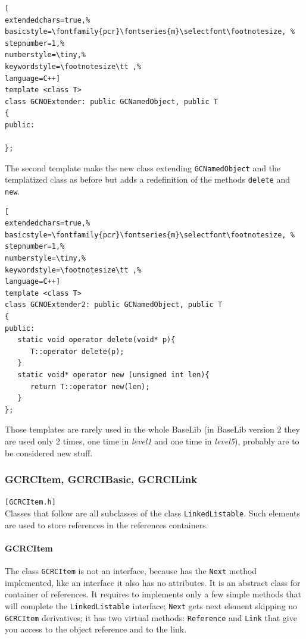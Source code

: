 \begin{lstlisting}[
extendedchars=true,%
basicstyle=\fontfamily{pcr}\fontseries{m}\selectfont\footnotesize, %
stepnumber=1,%
numberstyle=\tiny,%
keywordstyle=\footnotesize\tt ,%
language=C++]
template <class T>
class GCNOExtender: public GCNamedObject, public T
{
public:

};
\end{lstlisting}

The second template make the new class extending \texttt{GCNamedObject} and the templatized class as before but adds a redefinition of the methods \texttt{delete} and \texttt{new}.

\begin{lstlisting}[
extendedchars=true,%
basicstyle=\fontfamily{pcr}\fontseries{m}\selectfont\footnotesize, %
stepnumber=1,%
numberstyle=\tiny,%
keywordstyle=\footnotesize\tt ,%
language=C++]
template <class T>
class GCNOExtender2: public GCNamedObject, public T
{
public:
   static void operator delete(void* p){
      T::operator delete(p);
   }
   static void* operator new (unsigned int len){
      return T::operator new(len);
   }
};
\end{lstlisting}

Those templates are rarely used in the whole BaseLib (in BaseLib version 2 they are used only 2 times, one time in \textit{level1} and one time in \textit{level5}), probably are to be considered new stuff.



\subsubsection{GCRCItem, GCRCIBasic, GCRCILink}
\texttt{[GCRCItem.h]}\\
Classes that follow are all subclasses of the class \texttt{LinkedListable}. Such elements are used to store references in the references containers.

\paragraph{GCRCItem}
The class \texttt{GCRCItem} is not an interface, because has the \texttt{Next} method implemented, like an interface it also has no attributes. It is an abstract class for container of references. It requires to implements only a few simple methods that will complete the \texttt{LinkedListable} interface; \texttt{Next} gets next element skipping no \texttt{GCRCItem} derivatives; it has two virtual methods: \texttt{Reference} and \texttt{Link} that give you access to the object reference and to the link.

